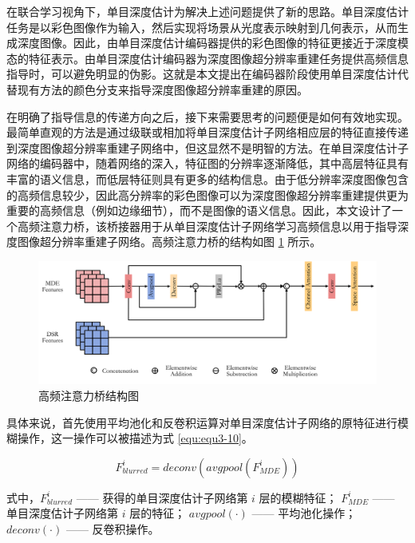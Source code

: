 在联合学习视角下，单目深度估计为解决上述问题提供了新的思路。单目深度估计任务是以彩色图像作为输入，然后实现将场景从光度表示映射到几何表示，从而生成深度图像。因此，由单目深度估计编码器提供的彩色图像的特征更接近于深度模态的特征表示。由单目深度估计编码器为深度图像超分辨率重建任务提供高频信息指导时，可以避免明显的伪影。这就是本文提出在编码器阶段使用单目深度估计代替现有方法的颜色分支来指导深度图像超分辨率重建的原因。

在明确了指导信息的传递方向之后，接下来需要思考的问题便是如何有效地实现。最简单直观的方法是通过级联或相加将单目深度估计子网络相应层的特征直接传递到深度图像超分辨率重建子网络中，但这显然不是明智的方法。在单目深度估计子网络的编码器中，随着网络的深入，特征图的分辨率逐渐降低，其中高层特征具有丰富的语义信息，而低层特征则具有更多的结构信息。由于低分辨率深度图像包含的高频信息较少，因此高分辨率的彩色图像可以为深度图像超分辨率重建提供更为重要的高频信息（例如边缘细节），而不是图像的语义信息。因此，本文设计了一个高频注意力桥，该桥接器用于从单目深度估计子网络学习高频信息以用于指导深度图像超分辨率重建子网络。高频注意力桥的结构如图 \ref{fig:fig3-5} 所示。

\begin{figure}[!htbp]
	\centering
	\includegraphics{figures/22.png}
	\caption{高频注意力桥结构图}
	\label{fig:fig3-5}
	\vspace{-0.8cm}  %
\end{figure}

具体来说，首先使用平均池化和反卷积运算对单目深度估计子网络的原特征进行模糊操作，这一操作可以被描述为式 \ref{equ:equ3-10}。

\begin{equation}
	F_{blurred}^i=deconv\left(avgpool\left(F_{MDE}^i\right)\right)
	\label{equ:equ3-10}
\end{equation}

\noindent 式中，$F_{blurred}^i$ —— 获得的单目深度估计子网络第 $i$ 层的模糊特征；\newline
\indent\quad  $F_{MDE}^i$ —— 单目深度估计子网络第 $i$ 层的特征；\newline
\indent\quad $avgpool\left(\cdot\right)$ —— 平均池化操作；\newline
\indent\quad $deconv\left(\cdot\right)$ —— 反卷积操作。

